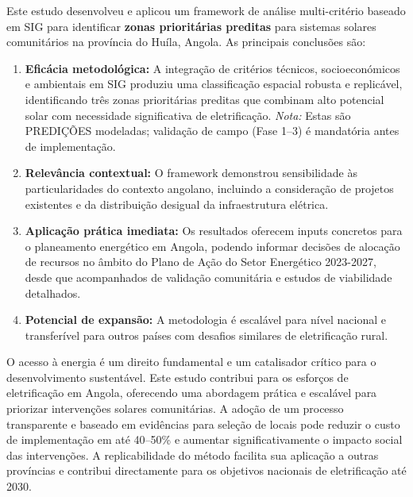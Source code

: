 \documentclass[12pt, a4paper]{article}
\begin{document}
\begin{itemize}
Este estudo desenvolveu e aplicou um framework de análise multi-critério baseado em SIG para identificar \textbf{zonas prioritárias preditas} para sistemas solares comunitários na província do Huíla, Angola. As principais conclusões são:

\begin{enumerate}
\item \textbf{Eficácia metodológica:} A integração de critérios técnicos, socioeconómicos e ambientais em SIG produziu uma classificação espacial robusta e replicável, identificando três zonas prioritárias preditas que combinam alto potencial solar com necessidade significativa de eletrificação. \textit{Nota:} Estas são PREDIÇÕES modeladas; validação de campo (Fase 1--3) é mandatória antes de implementação.

\item \textbf{Relevância contextual:} O framework demonstrou sensibilidade às particularidades do contexto angolano, incluindo a consideração de projetos existentes e da distribuição desigual da infraestrutura elétrica.

\item \textbf{Aplicação prática imediata:} Os resultados oferecem inputs concretos para o planeamento energético em Angola, podendo informar decisões de alocação de recursos no âmbito do Plano de Ação do Setor Energético 2023-2027, desde que acompanhados de validação comunitária e estudos de viabilidade detalhados.

\item \textbf{Potencial de expansão:} A metodologia é escalável para nível nacional e transferível para outros países com desafios similares de eletrificação rural.
\end{enumerate}

O acesso à energia é um direito fundamental e um catalisador crítico para o desenvolvimento sustentável. Este estudo contribui para os esforços de eletrificação em Angola, oferecendo uma abordagem prática e escalável para priorizar intervenções solares comunitárias. A adoção de um processo transparente e baseado em evidências para seleção de locais pode reduzir o custo de implementação em até 40--50\% e aumentar significativamente o impacto social das intervenções. A replicabilidade do método facilita sua aplicação a outras províncias e contribui directamente para os objetivos nacionais de eletrificação até 2030.


\end{itemize}
\end{document}

